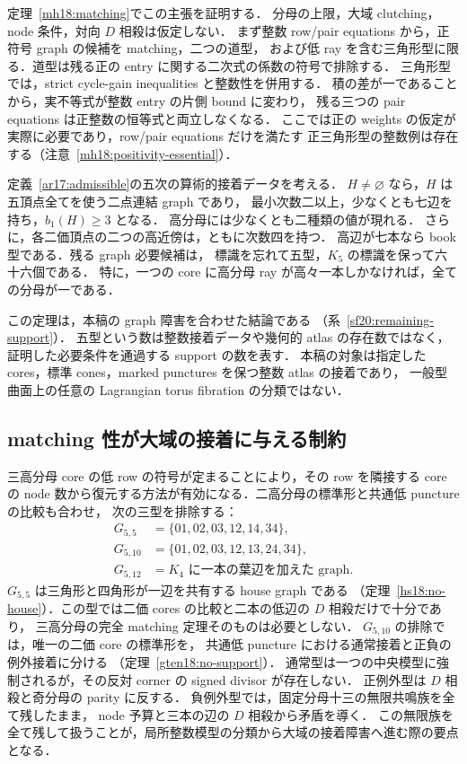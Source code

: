 定理~\ref{mh18:matching}でこの主張を証明する．
分母の上限，大域 clutching，node 条件，対向 $D$ 相殺は仮定しない．
まず整数 row/pair equations から，正符号 graph の候補を matching，二つの道型，
および低 ray を含む三角形型に限る．道型は残る正の entry に関する二次式の係数の符号で排除する．
三角形型では，strict cycle-gain inequalities と整数性を併用する．
積の差が一であることから，実不等式が整数 entry の片側 bound に変わり，
残る三つの pair equations は正整数の恒等式と両立しなくなる．
ここでは正の weights の仮定が実際に必要であり，row/pair equations だけを満たす
正三角形型の整数例は存在する（注意~\ref{mh18:positivity-essential}）．

\begin{theorem}
\label{ar17:main-support}
定義~\ref{ar17:admissible}の五次の算術的接着データを考える．
$H\ne\varnothing$ なら，$H$ は五頂点全てを使う二点連結 graph であり，
最小次数二以上，少なくとも七辺を持ち，$b_1(H)\ge3$ となる．
高分母には少なくとも二種類の値が現れる．
さらに，各二価頂点の二つの高近傍は，ともに次数四を持つ．
高辺が七本なら book 型である．残る graph 必要候補は，
標識を忘れて五型，$K_5$ の標識を保って六十六個である．
特に，一つの core に高分母 ray が高々一本しかなければ，全ての分母が一である．
\end{theorem}

この定理は，本稿の graph 障害を合わせた結論である
（系~\ref{sf20:remaining-support}）．
五型という数は整数接着データや幾何的 atlas の存在数ではなく，
証明した必要条件を通過する support の数を表す．
本稿の対象は指定した cores，標準 cones，marked punctures を保つ整数 atlas の接着であり，
一般型曲面上の任意の Lagrangian torus fibration の分類ではない．

\subsection{matching 性が大域の接着に与える制約}

三高分母 core の低 row の符号が定まることにより，その row を隣接する core の
node 数から復元する方法が有効になる．二高分母の標準形と共通低 puncture の比較も合わせ，
次の三型を排除する：
\[
 \begin{split}
 G_{5,5}&=\{01,02,03,12,14,34\},\\
 G_{5,10}&=\{01,02,03,12,13,24,34\},\\
 G_{5,12}&=K_4\text{ に一本の葉辺を加えた graph}.
 \end{split}
\]
$G_{5,5}$ は三角形と四角形が一辺を共有する house graph である
（定理~\ref{hs18:no-house}）．この型では二価 cores の比較と二本の低辺の $D$ 相殺だけで十分であり，
三高分母の完全 matching 定理そのものは必要としない．
$G_{5,10}$ の排除では，唯一の二価 core の標準形を，
共通低 puncture における通常接着と正負の例外接着に分ける
（定理~\ref{gten18:no-support}）．
通常型は一つの中央模型に強制されるが，その反対 corner の signed divisor が存在しない．
正例外型は $D$ 相殺と奇分母の parity に反する．
負例外型では，固定分母十三の無限共鳴族を全て残したまま，
node 予算と三本の辺の $D$ 相殺から矛盾を導く．
この無限族を全て残して扱うことが，局所整数模型の分類から大域の接着障害へ進む際の要点となる．

